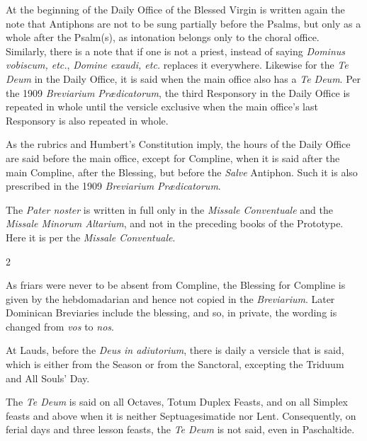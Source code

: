 At the beginning of the Daily Office of the Blessed Virgin is written again the note that Antiphons are not to be sung partially before the Psalms, but only as a whole after the Psalm(s), as intonation belongs only to the choral office. Similarly, there is a note that if one is not a priest, instead of saying \emph{Dominus vobiscum, etc.}, \emph{Domine exaudi, etc.} replaces it everywhere. Likewise for the \emph{Te Deum} in the Daily Office, it is said when the main office also has a \emph{Te Deum}. Per the 1909 \emph{Breviarium Pr\ae dicatorum}, the third Responsory in the Daily Office is repeated in whole until the versicle exclusive when the main office's last Responsory is also repeated in whole.

As the rubrics and Humbert's Constitution imply, the hours of the Daily Office are said before the main office, except for Compline, when it is said after the main Compline, after the Blessing, but before the \emph{Salve} Antiphon. Such it is also prescribed in the 1909 \emph{Breviarium Pr\ae dicatorum}.


The \emph{Pater noster} is written in full only in the \emph{Missale Conventuale} and the \emph{Missale Minorum Altarium}, and not in the preceding books of the Prototype. Here it is per the \emph{Missale Conventuale}.
\begin{multicols}{2}
\end{multicols}


As friars were never to be absent from Compline, the Blessing for Compline is given by the hebdomadarian and hence not copied in the \emph{Breviarium}. Later Dominican Breviaries include the blessing, and so, in private, the wording is changed from \emph{vos} to \emph{nos}.

At Lauds, before the \emph{Deus in adiutorium}, there is daily a versicle that is said, which is either from the Season or from the Sanctoral, excepting the Triduum and All Souls' Day.


The \emph{Te Deum} is said on all Octaves, Totum Duplex Feasts, and on all Simplex feasts and above when it is neither Septuagesimatide nor Lent. Consequently, on ferial days and three lesson feasts, the \emph{Te Deum} is not said, even in Paschaltide.

